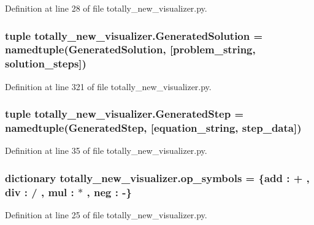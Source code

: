 Definition at line 28 of file totally\+\_\+new\+\_\+visualizer.\+py.

\hypertarget{namespacetotally__new__visualizer_ab9dc95295259f8165e1fdf15f954d2b1}{}
\subsubsection[{Generated\+Solution}]{\setlength{\rightskip}{0pt plus 5cm}tuple totally\+\_\+new\+\_\+visualizer.\+Generated\+Solution = namedtuple(\textquotesingle{}Generated\+Solution\textquotesingle{}, \mbox{[}\textquotesingle{}problem\+\_\+string\textquotesingle{}, \textquotesingle{}solution\+\_\+steps\textquotesingle{}\mbox{]})}\label{namespacetotally__new__visualizer_ab9dc95295259f8165e1fdf15f954d2b1}


Definition at line 321 of file totally\+\_\+new\+\_\+visualizer.\+py.

\hypertarget{namespacetotally__new__visualizer_a69a6b4328317f3ea8abc150eafbda370}{}
\subsubsection[{Generated\+Step}]{\setlength{\rightskip}{0pt plus 5cm}tuple totally\+\_\+new\+\_\+visualizer.\+Generated\+Step = namedtuple(\textquotesingle{}Generated\+Step\textquotesingle{}, \mbox{[}\textquotesingle{}equation\+\_\+string\textquotesingle{}, \textquotesingle{}step\+\_\+data\textquotesingle{}\mbox{]})}\label{namespacetotally__new__visualizer_a69a6b4328317f3ea8abc150eafbda370}


Definition at line 35 of file totally\+\_\+new\+\_\+visualizer.\+py.

\hypertarget{namespacetotally__new__visualizer_a3dd0f4daa013b2acf2fbd1f7aa0ad07c}{}
\subsubsection[{op\+\_\+symbols}]{\setlength{\rightskip}{0pt plus 5cm}dictionary totally\+\_\+new\+\_\+visualizer.\+op\+\_\+symbols = \{\textquotesingle{}add\textquotesingle{} \+: \textquotesingle{}+\textquotesingle{} , \textquotesingle{}div\textquotesingle{} \+: \textquotesingle{}/\textquotesingle{} , \textquotesingle{}mul\textquotesingle{} \+: \textquotesingle{}$\ast$\textquotesingle{} , \textquotesingle{}neg\textquotesingle{} \+: \textquotesingle{}-\/\textquotesingle{}\}}\label{namespacetotally__new__visualizer_a3dd0f4daa013b2acf2fbd1f7aa0ad07c}


Definition at line 25 of file totally\+\_\+new\+\_\+visualizer.\+py.

